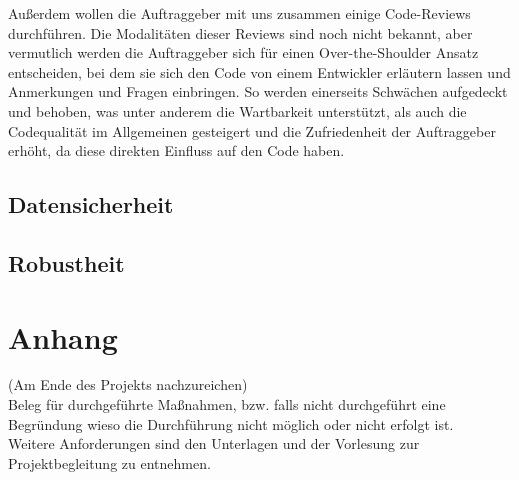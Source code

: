 \documentclass[accentcolor=tud0b,12pt,paper=a4]{tudreport}
\begin{document}
                Außerdem wollen die Auftraggeber mit uns zusammen einige Code-Reviews durchführen. Die Modalitäten dieser Reviews sind noch nicht bekannt, aber vermutlich werden die Auftraggeber sich für einen Over-the-Shoulder Ansatz entscheiden, bei dem sie sich den Code von einem Entwickler erläutern lassen und Anmerkungen und Fragen einbringen. So werden einerseits Schwächen aufgedeckt und behoben, was unter anderem die Wartbarkeit unterstützt, als auch die Codequalität im Allgemeinen gesteigert und die Zufriedenheit der Auftraggeber erhöht, da diese direkten Einfluss auf den Code haben. 

                \newpage
        \section{Datensicherheit}
        
        \section{Robustheit}
        
\appendix	
	\chapter{Anhang}
		(Am Ende des Projekts nachzureichen)\\
		Beleg für durchgeführte Maßnahmen, bzw. falls nicht durchgeführt eine Begründung wieso die Durchführung nicht möglich oder nicht erfolgt ist. \\
		Weitere Anforderungen sind den Unterlagen und der Vorlesung zur Projektbegleitung zu entnehmen.
	
\end{document}
